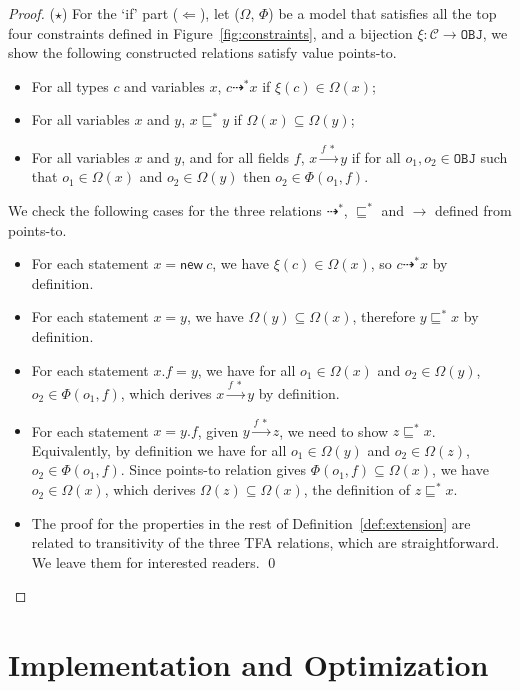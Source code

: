 \documentclass{llncs}
\newcommand{\keyword}[1]{\mathsf{#1}}
\newcommand{\kwnew}[0]{\keyword{new}}
\newcommand\Obj{\mathtt{OBJ}}
\newcommand{\VPT}{\Omega}
\newcommand{\HPT}{\Phi}
\newcommand{\Class}{\mathcal{C}}
\newcommand{\less}{\sqsubseteq}
\newcommand{\tflow}{\dashrightarrow}
\newcommand{\hflow}{\longrightarrow}
\newcommand{\lhflow}[1]{\stackrel{#1}{\hflow}}
\begin{document}
\begin{proof}
\medskip

($\star$) For the `if' part ($\Leftarrow$), let ($\VPT$, $\HPT$) be a model that satisfies all the top four constraints defined in Figure~\ref{fig:constraints}, and a bijection $\xi:\Class\rightarrow\Obj$, we show the following constructed relations satisfy value points-to.
\begin{itemize}
  \item For all types $c$ and variables $x$, $c\tflow^* x$ if $\xi(c)\in\VPT(x)$;
  \item For all variables $x$ and $y$, $x\less^*y$ if $\VPT(x)\subseteq\VPT(y)$;
  \item For all variables $x$ and $y$, and for all fields $f$, $x\lhflow{f\ *}y$ if for all $o_1,o_2\in\Obj$ such that $o_1\in\VPT(x)$ and $o_2\in\VPT(y)$ then $o_2\in\HPT(o_1,f)$.
\end{itemize}
We check the following cases for the three relations $\tflow^*$, $\less^*$ and $\rightarrow$ defined from points-to.
\begin{itemize}
\item For each statement $x = \kwnew\ c$, we have $\xi(c)\in\VPT(x)$, so $c\tflow^* x$ by definition.
\item For each statement $x = y$, we have $\VPT(y)\subseteq\VPT(x)$, therefore $y\less^*x$ by definition.
\item For each statement $x.f = y$, we have for all $o_1\in\VPT(x)$ and $o_2\in\VPT(y)$, $o_2\in\HPT(o_1,f)$, which derives $x\lhflow{f\ *}y$ by definition.
\item  For each statement $x = y.f$, given $y\lhflow{f\ *}z$, we need to show $z\less^* x$. Equivalently, by definition we have for all $o_1\in\VPT(y)$ and $o_2\in\VPT(z)$, $o_2\in\HPT(o_1,f)$. Since points-to relation gives $\HPT(o_1,f)\subseteq\VPT(x)$, we have $o_2\in\VPT(x)$, which derives $\VPT(z)\subseteq\VPT(x)$, the definition of $z\less^* x$.
\item The proof for the properties in the rest of Definition~\ref{def:extension} are related to transitivity of the three TFA relations, which are straightforward. We leave them for interested readers. \qed
\end{itemize}
\end{proof}



\section{Implementation and Optimization}\label{sec:minimization}
\end{document}
